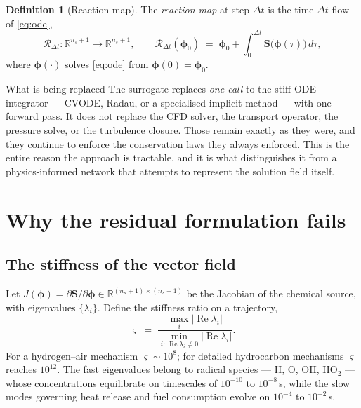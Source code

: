 \documentclass[11pt]{article}
\newcommand{\R}{\mathbb{R}}
\newcommand{\vv}[1]{\bm{#1}}
\newcommand{\phiv}{\vv{\phi}}
\newcommand{\Sv}{\vv{S}}
\newcommand{\Rmap}{\mathcal{R}}
\newcommand{\dt}{\Delta t}
\theoremstyle{plain}
\theoremstyle{definition}
\newtheorem{definition}[theorem]{Definition}
\begin{document}
\begin{definition}[Reaction map]
The \emph{reaction map} at step $\dt$ is the time-$\dt$ flow of \eqref{eq:ode},
\begin{equation}
\Rmap_{\dt}: \R^{n_s+1}\to\R^{n_s+1},
\qquad
\Rmap_{\dt}(\phiv_0) \;=\; \phiv_0 + \int_{0}^{\dt}\Sv\big(\phiv(\tau)\big)\,d\tau ,
\label{eq:reactionmap}
\end{equation}
where $\phiv(\cdot)$ solves \eqref{eq:ode} from $\phiv(0)=\phiv_0$.
\end{definition}

\begin{engbox}{What is being replaced}
The surrogate replaces \emph{one call} to the stiff ODE integrator --- CVODE,
Radau, or a specialised implicit method --- with one forward pass. It does not
replace the CFD solver, the transport operator, the pressure solve, or the
turbulence closure. Those remain exactly as they were, and they continue to
enforce the conservation laws they always enforced. This is the entire reason
the approach is tractable, and it is what distinguishes it from a
physics-informed network that attempts to represent the solution field itself.
\end{engbox}

\section{Why the residual formulation fails}

\subsection{The stiffness of the vector field}

Let $J(\phiv) = \partial\Sv/\partial\phiv \in \R^{(n_s+1)\times(n_s+1)}$ be the
Jacobian of the chemical source, with eigenvalues $\{\lambda_i\}$. Define the
stiffness ratio on a trajectory,
\begin{equation}
\varsigma \;=\;
\frac{\max_i \left|\operatorname{Re}\lambda_i\right|}
     {\min_{i:\,\operatorname{Re}\lambda_i\neq 0} \left|\operatorname{Re}\lambda_i\right|}.
\label{eq:stiffratio}
\end{equation}
For a hydrogen--air mechanism $\varsigma \sim 10^{8}$; for detailed
hydrocarbon mechanisms $\varsigma$ reaches $10^{12}$. The fast eigenvalues
belong to radical species --- $\mathrm{H}$, $\mathrm{O}$, $\mathrm{OH}$,
$\mathrm{HO_2}$ --- whose concentrations equilibrate on timescales of
$10^{-10}$ to $10^{-8}\,$s, while the slow modes governing heat release and
fuel consumption evolve on $10^{-4}$ to $10^{-2}\,$s.
\end{document}
